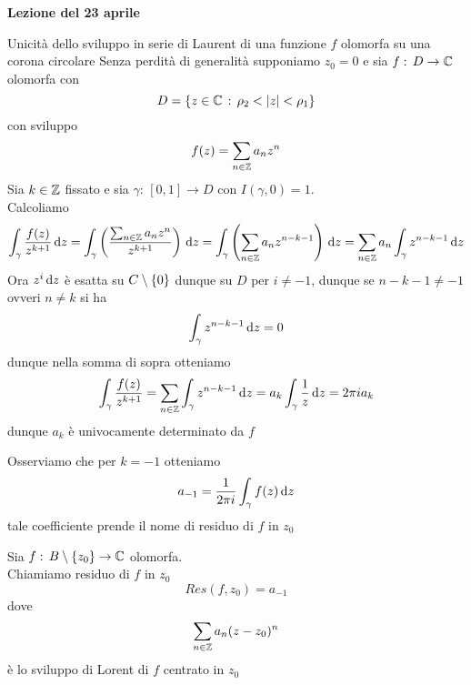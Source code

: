 

\textbf{Lezione del 23 aprile}
\begin{thm}Unicit\`a dello sviluppo in serie di Laurent di una funzione $f$ olomorfa su una corona circolare
\proof Senza perdit\`a di generalit\`a supponiamo $z_0=0$ e sia $f:\, D \to \mathbb{C}$ olomorfa con 
$$ D=\left\{ z\in \mathbb{C} \, : \, \rho_2<\left\vert z \right\vert<\rho_1 \right\}$$ 
con sviluppo
$$ f(z) =\sum_{n \in \mathbb{Z}} a_n z^n$$ 
Sia $k\in \mathbb{Z}$ fissato e sia $\gamma:\, [0,1]\to D$ con $I(\gamma,0) =1$.\\
Calcoliamo 
$$\int_\gamma \frac{f(z)}{z^{k+1}} \, \mathrm{d}z  = \int_{\gamma} \left( \frac{\sum_{n \in \mathbb{Z}} a_n z^n }{z^{k+1}} \right) \, \mathrm{d}z = \int_\gamma \left( \sum_{n\in \mathbb{Z}} a_nz^{n-k-1} \right)\, \mathrm{d}z = \sum_{n\in \mathbb{Z}} a_n \int_{\gamma} z^{n-k-1} \, \mathrm{d}z $$
Ora $z^i\, \mathrm{d}z $ \`e esatta su $C\setminus \left\{ 0 \right\}$ dunque su $D$ per $i\neq -1$, dunque se $n-k-1\neq -1$ ovveri $n\neq k$ si ha 
$$\int_\gamma z^{n-k-1} \, \mathrm{d}z =0$$
dunque nella somma di sopra otteniamo 
$$ \int_{\gamma} \frac{f(z)}{z^{k+1}} = \sum_{n \in \mathbb{Z}} \int_{\gamma}z^{n-k-1} \, \mathrm{d}z = a_k \int_{\gamma} \frac{1}{z} \, \mathrm{d}z =2\pi i a_k $$
dunque $a_k$ \`e univocamente determinato da $f$ 
\end{thm}
\begin{oss}Osserviamo che per $k=-1$ otteniamo 
$$ a_{-1}  =\frac{1}{2\pi i } \int_{\gamma} f(z) \, \mathrm{d}z $$
tale coefficiente prende il nome di residuo di $f$ in $z_0$
\end{oss}
\spazio
\begin{defn}Sia $f:\, B \setminus \left\{ z_0 \right\}\to \mathbb{C}$ olomorfa.\\
Chiamiamo residuo di $f$ in $z_0$
$$Res(f,z_0) = a_{-1}$$ 
dove 
$$\sum_{n \in \mathbb{Z}} a_n (z-z_0)^n$$
\`e lo sviluppo di Lorent di $f$ centrato in $z_0$
\end{defn}
\newpage

